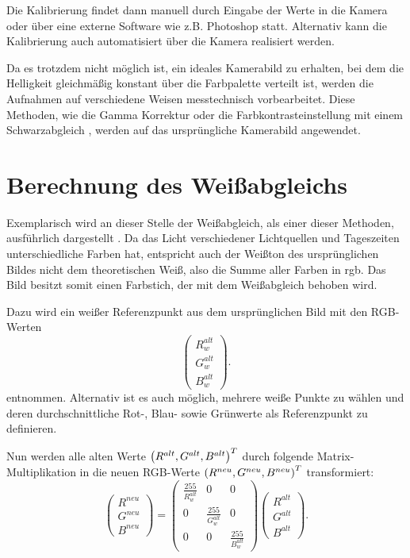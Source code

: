 {Die Kalibrierung findet dann manuell durch
Eingabe der Werte in die Kamera oder über eine externe Software wie z.B. Photoshop statt.
Alternativ kann die Kalibrierung auch automatisiert über die Kamera realisiert werden.

Da es trotzdem nicht möglich ist, ein ideales Kamerabild zu er\-halten, 
bei dem die Helligkeit gleichmäßig konstant über die Farbpalette verteilt ist, 
werden die Aufnahmen auf verschiedene Weisen messtechnisch vorbearbeitet.
Diese Methoden, wie die Gamma Korrektur oder 
die Farb\-kontrasteinstellung mit einem Schwarzabgleich \cite{Balluff:2024},
werden auf das ursprüngliche Kamerabild angewendet.

\section{Berechnung des Weißabgleichs}

Exemplarisch wird an dieser Stelle der Weißabgleich,
als einer dieser Methoden, ausführlich dargestellt \cite{Rohs:2012}.
Da das Licht verschiedener Lichtquellen und Tageszeiten unterschiedliche Farben hat, 
entspricht auch der Weißton des ursprünglichen Bildes 
nicht dem theoretischen Weiß, also die Summe aller Farben in \acs{rgb}. 
Das Bild besitzt somit einen Farbstich, der mit dem Weißabgleich behoben wird. 

Dazu wird ein weißer Referenzpunkt aus dem ursprünglichen Bild mit den RGB-Werten
\[
\left ( \begin{array}{c} R^{alt}_w \\ G^{alt}_w \\ B^{alt}_w 
\end{array}\right ).
\] 
entnommen. Alternativ ist es auch möglich, mehrere weiße Punkte zu wählen 
und deren durchschnittliche Rot-, Blau- sowie Grünwerte als Referenzpunkt zu definieren.

Nun werden alle alten Werte 
$\left ( R^{alt}, \\ G^{alt}, \\ B^{alt}  \right )^T$
durch folgende Matrix-Multiplikation in die neuen RGB-Werte 
$\left ( R^{neu}, \\ G^{neu}, \\ B^{neu}  \right )^T$	transformiert: 
\[
\left ( 
\begin{array}{c} 
    R^{neu} \\ G^{neu}  \\ B^{neu}  
\end{array}
\right ) =
\left ( 
\begin{array}{ccc} 
    \frac{255}{R^{alt}_w} 			& 0 						& 0 \\
    0 								& \frac{255}{G^{alt}_w} & 0 \\ 
    0 								& 0							& \frac{255}{B^{alt}_w}
\end{array}
\right )
\left ( 
\begin{array}{c} 
    R^{alt} \\ G^{alt} \\ B^{alt}
\end{array}
\right ).
\] 

}
